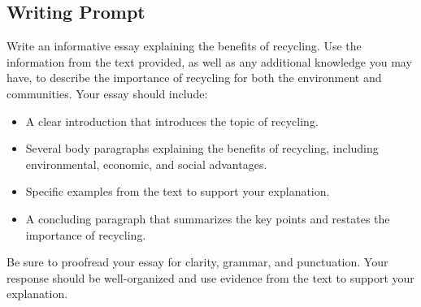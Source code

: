\documentclass[12pt]{article}
\begin{document}
\vspace{1cm}

\subsection*{Writing Prompt}

Write an informative essay explaining the benefits of recycling. Use the information from the text provided, as well as any additional knowledge you may have, to describe the importance of recycling for both the environment and communities. Your essay should include:

\begin{itemize}
    \item A clear introduction that introduces the topic of recycling.
    \item Several body paragraphs explaining the benefits of recycling, including environmental, economic, and social advantages.
    \item Specific examples from the text to support your explanation.
    \item A concluding paragraph that summarizes the key points and restates the importance of recycling.
\end{itemize}

Be sure to proofread your essay for clarity, grammar, and punctuation. Your response should be well-organized and use evidence from the text to support your explanation.
 
\end{document}
